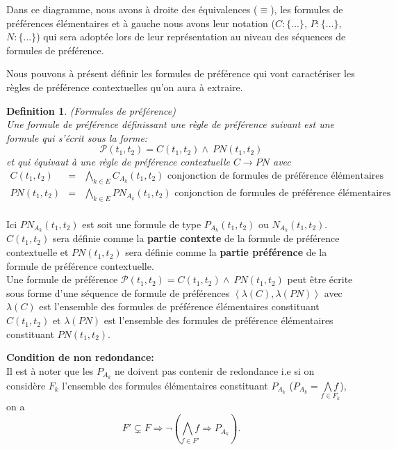 \documentclass[a4paper,12pt,openany,oneside]{article}
\newtheorem{defn}{Definition} %
\begin{document}
Dans ce diagramme, nous avons à droite des équivalences ($\equiv$), les formules de préférences élémentaires et à gauche nous avons leur notation ($C:\{...\}$, $P:\{...\}$,$N:\{...\}$) qui sera adoptée lors de leur représentation au niveau des séquences de formules de préférence.




Nous pouvons à présent définir les formules de préférence qui vont caractériser les règles de préférence contextuelles qu'on aura à extraire.
 
 	\begin{defn}(Formules de préférence)\\
 	Une formule de préférence définissant une règle de préférence suivant est une formule qui s'écrit sous la forme:
 	\[
 		\mathcal{P}(t_{1},t_{2})=C(t_{1},t_{2})\wedge\ PN(t_{1},t_{2})
 	\]
et qui équivaut à une règle de préférence contextuelle $C\rightarrow PN$
 	avec
 	\[
 	\begin{array}{rcl}
 			C(t_{1},t_{2})&=&\underset{k\in E}{\bigwedge} C_{A_{k}}(t_{1},t_{2}) \text{ conjonction de formules de préférence élémentaires symétriques}\\
 			PN(t_{1},t_{2})&=&\underset{k\in E}{\bigwedge} PN_{A_{k}}(t_{1},t_{2})\text{ conjonction de formules de préférence élémentaires asymétriques}\\  	
	\end{array}
 	\]
 
 	\end{defn}
	Ici $PN_{A_k}(t_1,t_2)$ est soit une formule de type $P_{A_k}(t_1,t_2)$ ou $N_{A_k}(t_1,t_2)$.\\
	
	$C(t_1,t_2)$ sera définie comme  la \textbf{partie contexte}  de la formule de préférence contextuelle et $PN(t_1,t_2)$ sera définie comme la \textbf{partie préférence} de la formule de préférence contextuelle.\\

Une formule de préférence $\mathcal{P}(t_{1},t_{2})=C(t_{1},t_{2})\wedge\ PN(t_{1},t_{2})$ peut être écrite sous forme d'une séquence de formule de préférences $\left< \lambda(C),\lambda(PN)\right>$ avec $\lambda(C)$ est l'ensemble des formules de préférence élémentaires constituant $C(t_1,t_2)$ et $\lambda(PN)$ est l'ensemble des formules de préférence élémentaires constituant $PN(t_1,t_2)$.
 		 
 


       	\textbf{Condition de non redondance:}\\
       	Il est à noter que les $P_{A_{k}}$ ne doivent pas contenir de redondance i.e si on considère $F_{k}$ l'ensemble des formules élémentaires constituant $P_{A_{k}}$ ($P_{A_{k}}=\underset{f\in F_{k}}{\bigwedge f}$), on a 
       	\[
       	 F'\subsetneq F\Rightarrow \neg (\underset{f\in F'}{\bigwedge f}\Rightarrow P_{A_{k}}).
       	\]
 
\end{document}
